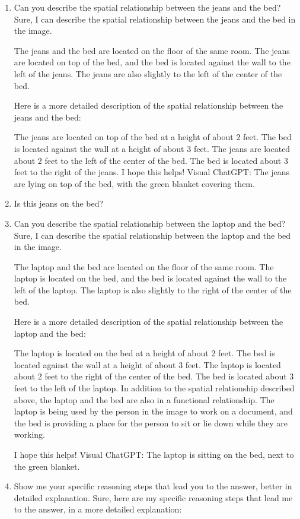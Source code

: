 \begin{enumerate}
    \item Can you describe the spatial relationship between the jeans and the bed?
    \subitem 
    Sure, I can describe the spatial relationship between the jeans and the bed in the image.
    
    The jeans and the bed are located on the floor of the same room. The jeans are located on top of the bed, and the bed is located against the wall to the left of the jeans. The jeans are also slightly to the left of the center of the bed.
    
    Here is a more detailed description of the spatial relationship between the jeans and the bed:
    
    The jeans are located on top of the bed at a height of about 2 feet.
    The bed is located against the wall at a height of about 3 feet.
    The jeans are located about 2 feet to the left of the center of the bed.
    The bed is located about 3 feet to the right of the jeans.
    I hope this helps!
    \subitem Visual ChatGPT: The jeans are lying on top of the bed, with the green blanket covering them.
    \item Is this jeans on the bed?
    \item Can you describe the spatial relationship between the laptop and the bed?
    \subitem 
    Sure, I can describe the spatial relationship between the laptop and the bed in the image.
    
    The laptop and the bed are located on the floor of the same room. The laptop is located on the bed, and the bed is located against the wall to the left of the laptop. The laptop is also slightly to the right of the center of the bed.
    
    Here is a more detailed description of the spatial relationship between the laptop and the bed:
    
    The laptop is located on the bed at a height of about 2 feet.
    The bed is located against the wall at a height of about 3 feet.
    The laptop is located about 2 feet to the right of the center of the bed.
    The bed is located about 3 feet to the left of the laptop.
    In addition to the spatial relationship described above, the laptop and the bed are also in a functional relationship. The laptop is being used by the person in the image to work on a document, and the bed is providing a place for the person to sit or lie down while they are working.
    
    I hope this helps!
    \subitem Visual ChatGPT: The laptop is sitting on the bed, next to the green blanket.
    \item Show me your specific reasoning steps that lead you to the answer, better in detailed explanation.
    \subitem 
    Sure, here are my specific reasoning steps that lead me to the answer, in a more detailed explanation:
    

\end{enumerate}
